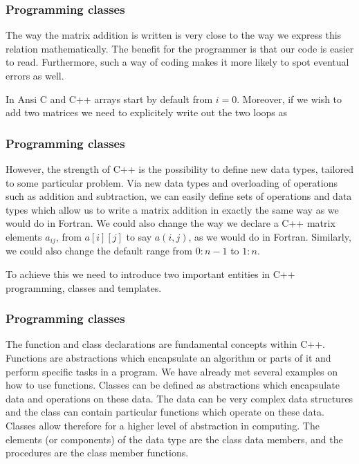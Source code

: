\documentclass[handout]{beamer}
\begin{document}
\begin{frame}
\frametitle{Programming classes}

The way the matrix addition is written is very close to the way we express this relation mathematically. The benefit for the
programmer is that our code is easier to read. Furthermore, such a way of coding makes it  more likely  to spot eventual
errors as well.

In Ansi C and C++ arrays start by default from $i=0$.  Moreover, if we  wish to add two matrices we need to explicitely write out
the two loops as

\begin{print}
   for(i=0 ; i < n ; i++) {
      for(j=0 ; j < n ; j++) {
         a[i][j]=b[i][j]+c[i][j]

\end{print}
\end{frame}

\begin{frame}
\frametitle{Programming classes}

However,
the strength of C++ is the possibility
to define new data types, tailored to some particular problem.
Via new data types and overloading of operations such as addition and subtraction, we can easily define
sets of operations and data types which allow us to write a matrix addition in exactly the same
way as we would do in Fortran.  We could also change the way we declare a C++ matrix elements $a_{ij}$, from  $a[i][j]$
to say $a(i,j)$, as we would do in Fortran. Similarly, we could also change the default range from $0:n-1$ to $1:n$.

To achieve this we need to introduce two important entities in C++ programming, classes and templates.
\end{frame}

\begin{frame}
\frametitle{Programming classes}

The function and class declarations are fundamental concepts within C++.  Functions are abstractions
which encapsulate an algorithm or parts of it and perform specific tasks in a program.
We have already met several examples on how to use  functions.
Classes can be defined as abstractions which encapsulate
data and operations on these data.
The data can be very complex data structures  and the class can contain particular functions
which operate on these data. Classes allow therefore for a higher level of abstraction in computing.
The elements (or components) of the data
type are the class data members, and the procedures are the class
member functions.
\end{frame}
\end{document}
